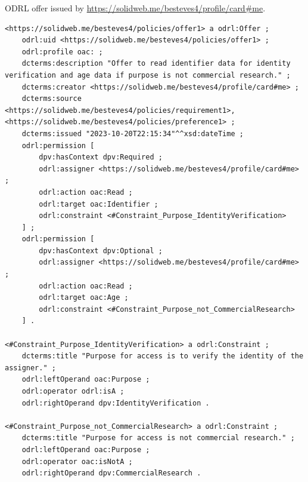 \begin{listing}[htp]
\caption{ODRL offer issued by \url{https://solidweb.me/besteves4/profile/card\#me}.}
\label{list:oac_offer}
\begin{verbatim}
<https://solidweb.me/besteves4/policies/offer1> a odrl:Offer ;
    odrl:uid <https://solidweb.me/besteves4/policies/offer1> ;
    odrl:profile oac: ;
    dcterms:description "Offer to read identifier data for identity verification and age data if purpose is not commercial research." ;
    dcterms:creator <https://solidweb.me/besteves4/profile/card#me> ;
    dcterms:source <https://solidweb.me/besteves4/policies/requirement1>, <https://solidweb.me/besteves4/policies/preference1> ;
    dcterms:issued "2023-10-20T22:15:34"^^xsd:dateTime ;
    odrl:permission [
        dpv:hasContext dpv:Required ;
        odrl:assigner <https://solidweb.me/besteves4/profile/card#me> ;
        odrl:action oac:Read ;
        odrl:target oac:Identifier ;
        odrl:constraint <#Constraint_Purpose_IdentityVerification>
    ] ;
    odrl:permission [
        dpv:hasContext dpv:Optional ;
        odrl:assigner <https://solidweb.me/besteves4/profile/card#me> ;
        odrl:action oac:Read ;
        odrl:target oac:Age ;
        odrl:constraint <#Constraint_Purpose_not_CommercialResearch>
    ] .

<#Constraint_Purpose_IdentityVerification> a odrl:Constraint ;
    dcterms:title "Purpose for access is to verify the identity of the assigner." ;
    odrl:leftOperand oac:Purpose ;
    odrl:operator odrl:isA ;
    odrl:rightOperand dpv:IdentityVerification .

<#Constraint_Purpose_not_CommercialResearch> a odrl:Constraint ;
    dcterms:title "Purpose for access is not commercial research." ;
    odrl:leftOperand oac:Purpose ;
    odrl:operator oac:isNotA ;
    odrl:rightOperand dpv:CommercialResearch .
\end{verbatim}
\end{listing}

